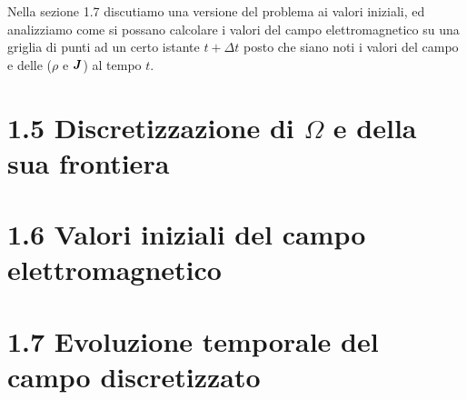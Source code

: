 Nella sezione 1.7 discutiamo una versione  del problema ai valori iniziali, ed analizziamo come si possano calcolare i valori del campo elettromagnetico su una griglia di punti ad un certo istante $t+\Delta t$ posto che siano noti i valori del campo e delle  ($\rho$ e $\vb*{J}$) al tempo $t$. 
 

\section*{1.5 Discretizzazione di $\Omega$ e della sua frontiera}\label{sec_1.5}


\section*{1.6 Valori iniziali del campo elettromagnetico}\label{sec_1.6}


\section*{1.7 Evoluzione temporale del campo discretizzato}\label{sec_1.6}

